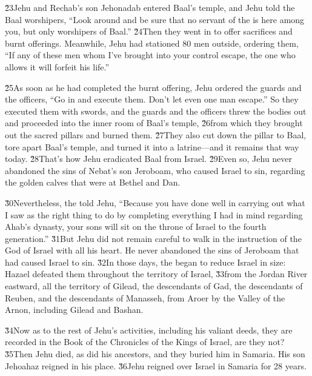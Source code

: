 \v{23}Jehu and Rechab's son Jehonadab entered Baal's temple, and Jehu told the Baal worshipers, ``Look around and be sure that no servant of the  is here among you, but only worshipers of Baal.'' \v{24}Then they went in to offer sacrifices and burnt offerings. Meanwhile, Jehu had stationed 80 men outside, ordering them, ``If any of these men whom I've brought into your control escape, the one who allows it will forfeit his life.''

\v{25}As soon as he had completed the burnt offering, Jehu ordered the guards and the officers, ``Go in and execute them. Don't let even one man escape.'' So they executed them with swords, and the guards and the officers threw the bodies out and proceeded into the inner room of Baal's temple, \v{26}from which they brought out the sacred pillars and burned them. \v{27}They also cut down the pillar to Baal, tore apart Baal's temple, and turned it into a latrine---and it remains that way today. \v{28}That's how Jehu eradicated Baal from Israel. \v{29}Even so, Jehu never abandoned the sins of Nebat's son Jeroboam, who caused Israel to sin, regarding the golden calves that were at Bethel and Dan.

\v{30}Nevertheless, the  told Jehu, ``Because you have done well in carrying out what I saw as the right thing to do by completing everything I had in mind regarding Ahab's dynasty, your sons will sit on the throne of Israel to the fourth generation.'' \v{31}But Jehu did not remain careful to walk in the instruction of the  God of Israel with all his heart. He never abandoned the sins of Jeroboam that had caused Israel to sin. \v{32}In those days, the  began to reduce Israel in size: Hazael defeated them throughout the territory of Israel, \v{33}from the Jordan River eastward, all the territory of Gilead, the descendants of Gad, the descendants of Reuben, and the descendants of Manasseh, from Aroer by the Valley of the Arnon, including Gilead and Bashan.

\v{34}Now as to the rest of Jehu's activities, including his valiant deeds, they are recorded in the Book of the Chronicles of the Kings of Israel, are they not? \v{35}Then Jehu died, as did his ancestors, and they buried him in Samaria. His son Jehoahaz reigned in his place. \v{36}Jehu reigned over Israel in Samaria for 28 years.

